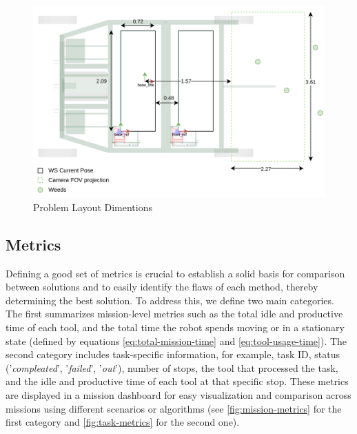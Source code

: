 \begin{figure}[bth]
    \centering
    \includegraphics[width=\linewidth]{gfx/ch02/problem_layout.png}
    \caption{Problem Layout Dimentions}
    \label{fig:problem-layout.png}
\end{figure}

\subsection{Metrics}
Defining a good set of metrics is crucial to establish a solid basis for comparison between solutions and to easily identify the flaws of each method, thereby determining the best solution. To address this, we define two main categories. The first summarizes mission-level metrics such as the total idle and productive time of each tool, and the total time the robot spends moving or in a stationary state (defined by equations \ref{eq:total-mission-time} and \ref{eq:tool-usage-time}). The second category includes task-specific information, for example, task ID, status ('\textit{compleated}', '\textit{failed}', '\textit{out}'), number of stops, the tool that processed the task, and the idle and productive time of each tool at that specific stop. These metrics are displayed in a mission dashboard for easy visualization and comparison across missions using different scenarios or algorithms (see \autoref{fig:mission-metrics} for the first category and \ref{fig:task-metrics} for the second one).

